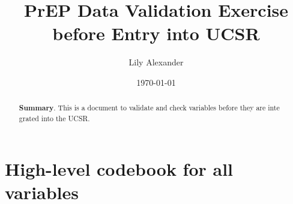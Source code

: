 \documentclass{article}
\begin{document}
\title{PrEP Data Validation Exercise before Entry into UCSR}\author{
Lily Alexander
}

\date{
\bigskip
\today
}

\maketitle

\begin{abstract}
\textbf{Summary}. This is a document to validate and check variables before they are inte
grated into the UCSR.
\end{abstract}

\section{High-level codebook for all variables}
\end{document}
